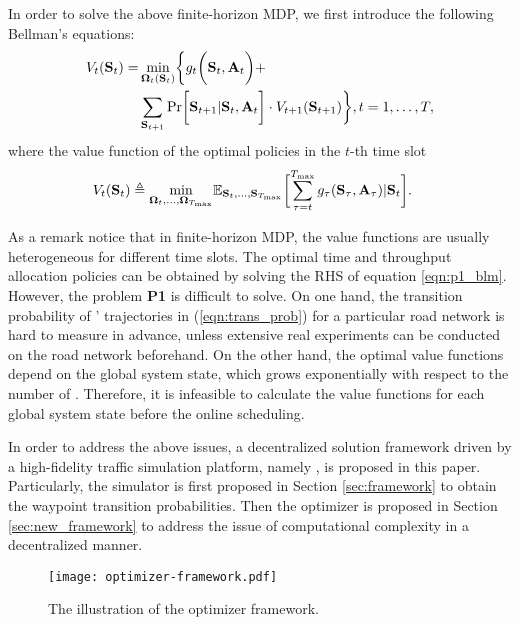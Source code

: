 In order to solve the above finite-horizon MDP, we first introduce the following Bellman's equations:
\begin{align}
    V_{t}(\Stat_t) =& \min_{\Policy_{t}(\Stat_t)} \Brace{ g_{t}\Paren{ \Stat_t, \vec{A}_t } +
    \nonumber\\
    &\sum_{\Stat_{t+1}} \Pr\Bracket{ \Stat_{t+1} | \Stat_{t}, \vec{A}_t } \cdot V_{t+1}(\Stat_{t+1})
    }, t=1,\dots,T,
    \label{eqn:p1_blm}
\end{align}
where the value function of the optimal policies in the $t$-th time slot
\begin{align}
    V_{t}(\Stat_{t}) \define \min_{\Policy_{t},\dots,\Policy_{\T}}& \mathbb{E}_{\Stat_{t},\dots,\Stat_{\T}}
    \Bracket{
        \sum_{\tau=t}^{\T} g_{\tau}\paren{ \Stat_{\tau}, \vec{A}_{\tau} } | \Stat_{t}
    }.
    \label{eqn:p1_val}
\end{align}

As a remark notice that in finite-horizon MDP, the value functions are usually heterogeneous for different time slots. The optimal time and throughput allocation policies can be obtained by solving the RHS of equation \eqref{eqn:p1_blm}.
However, the problem {\bf P1} is difficult to solve.
On one hand, the transition probability of {\IAVs}' trajectories in (\ref{eqn:trans_prob}) for a particular road network is hard to measure in advance, unless extensive real experiments can be conducted on the road network beforehand.
On the other hand, the optimal value functions depend on the global system state, which grows exponentially with respect to the number of {\IAVs}.
Therefore, it is infeasible to calculate the value functions for each global system state before the online scheduling.

In order to address the above issues, a decentralized solution framework driven by a high-fidelity traffic simulation platform, namely {\fwName}, is proposed in this paper.
Particularly, the {\fwName} simulator is first proposed in Section \ref{sec:framework} to obtain the waypoint transition probabilities.
Then the {\fwName} optimizer is proposed in Section \ref{sec:new_framework} to address the issue of computational complexity in a decentralized manner.

\begin{figure*}[htp!]
    \centering
    \texttt{[image: optimizer-framework.pdf]}
    \caption{The illustration of the {\fwName} optimizer framework.}
    \label{fig:optimizer_framework}
\end{figure*}

